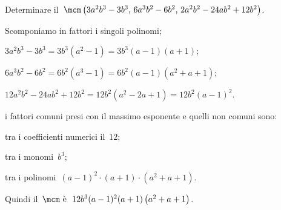 \begin{exrig}
 \begin{esempio}
Determinare il~$\mcm\left(3a^{2}b^{3}-3b^{3}\text{,~}6a^{3}b^{2}-6b^{2}\text{,~}2a^{2}b^{2}-24ab^{2}+12b^{2}\right)$.
 \begin{enumeratea}
 \item Scomponiamo in fattori i singoli polinomi;
  \begin{description*}
  \item $3a^{2}b^{3}-3b^{3}=3b^{3}\left(a^{2}-1\right)=3b^{3}(a-1)(a+1)$;
  \item $6a^{3}b^{2}-6b^{2}=6b^{2}\left(a^{3}-1\right)=6b^{2}(a-1)\left(a^{2}+a+1\right)$;
  \item $12a^{2}b^{2}-24ab^{2}+12b^{2}=12b^{2}\left(a^{2}-2a+1\right)=12b^{2}(a-1)^{2}$.
  \end{description*}
 \item i fattori comuni presi con il massimo esponente e quelli non comuni sono:
  \begin{description*}
  \item tra i coefficienti numerici il~$12$;
  \item tra i monomi~$b^{3}$;
  \item tra i polinomi~$(a-1)^{2}\cdot (a+1)\cdot \left(a^{2}+a+1\right)$.
  \end{description*}
 \end{enumeratea}
Quindi il~$\mcm\text{ è }~12b^{3}(a-1)^{2}(a+1)\left(a^{2}+a+1\right)$.
 \end{esempio}
\end{exrig}

\ovalbox{\risolvii \ref{ese:13.86}, \ref{ese:13.87}, \ref{ese:13.88}, \ref{ese:13.89}, \ref{ese:13.90}, \ref{ese:13.91}, \ref{ese:13.92}, \ref{ese:13.93}, \ref{ese:13.94}, \ref{ese:13.95}, \ref{ese:13.96}}

\newpage


\cleardoublepage
